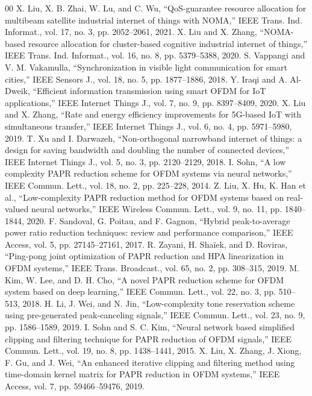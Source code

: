 \documentclass[journal]{IEEEtran}
\begin{document}
\begin{thebibliography}{00}
 X. Liu, X. B. Zhai, W. Lu, and C. Wu, “QoS-guarantee resource allocation for multibeam satellite industrial internet of things with NOMA,” IEEE Trans. Ind. Informat., vol. 17, no. 3, pp. 2052–2061, 2021.
 X. Liu and X. Zhang, “NOMA-based resource allocation for cluster-based cognitive industrial internet of things,” IEEE Trans. Ind. Informat., vol. 16, no. 8, pp. 5379–5388, 2020.
 S. Vappangi and V. M. Vakamulla, “Synchronization in visible light communication for smart cities,” IEEE Sensors J., vol. 18, no. 5, pp. 1877–1886, 2018.
 Y. Iraqi and A. Al-Dweik, “Efficient information transmission using smart OFDM for IoT applications,” IEEE Internet Things J., vol. 7, no. 9, pp. 8397–8409, 2020.
 X. Liu and X. Zhang, “Rate and energy efficiency improvements for 5G-based IoT with simultaneous transfer,” IEEE Internet Things J., vol. 6, no. 4, pp. 5971–5980, 2019.
 T. Xu and I. Darwazeh, “Non-orthogonal narrowband internet of things: a design for saving bandwidth and doubling the number of connected devices,” IEEE Internet Things J., vol. 5, no. 3, pp. 2120–2129, 2018.
 I. Sohn, “A low complexity PAPR reduction scheme for OFDM systems via neural networks,” IEEE Commun. Lett., vol. 18, no. 2, pp. 225–228, 2014.
 Z. Liu, X. Hu, K. Han et al., “Low-complexity PAPR reduction method for OFDM systems based on real-valued neural networks,” IEEE Wireless Commun. Lett., vol. 9, no. 11, pp. 1840–1844, 2020.
 F. Sandoval, G. Poitau, and F. Gagnon, “Hybrid peak-to-average power ratio reduction techniques: review and performance comparison,” IEEE Access, vol. 5, pp. 27145–27161, 2017.
 R. Zayani, H. Shaïek, and D. Roviras, “Ping-pong joint optimization of PAPR reduction and HPA linearization in OFDM systems,” IEEE Trans. Broadcast., vol. 65, no. 2, pp. 308–315, 2019.
 M. Kim, W. Lee, and D. H. Cho, “A novel PAPR reduction scheme for OFDM system based on deep learning,” IEEE Commun. Lett., vol. 22, no. 3, pp. 510–513, 2018.
 H. Li, J. Wei, and N. Jin, “Low-complexity tone reservation scheme using pre-generated peak-canceling signals,” IEEE Commun. Lett., vol. 23, no. 9, pp. 1586–1589, 2019.
 I. Sohn and S. C. Kim, “Neural network based simplified clipping and filtering technique for PAPR reduction of OFDM signals,” IEEE Commun. Lett., vol. 19, no. 8, pp. 1438–1441, 2015.
 X. Liu, X. Zhang, J. Xiong, F. Gu, and J. Wei, “An enhanced iterative clipping and filtering method using time-domain kernel matrix for PAPR reduction in OFDM systems,” IEEE Access, vol. 7, pp. 59466–59476, 2019.

\end{thebibliography}
\end{document}

